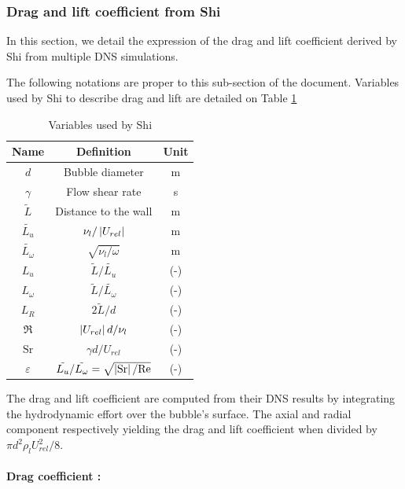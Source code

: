 \subsubsection{Drag and lift coefficient from Shi \etal}

In this section, we detail the expression of the drag and lift coefficient derived by Shi \etal from multiple DNS simulations.

\npar

The following notations are proper to this sub-section of the document. Variables used by Shi \etal to describe drag and lift are detailed on Table \ref{tab:var_shi}

\begin{table}[h!]
\centering
\begin{tabular}{|c|c|c|}
\hline
Name & Definition & Unit\\
\hline
\hline

$d$ & Bubble diameter & m\\
\hline
$\gamma$ & Flow shear rate & s\up{-1}\\
\hline
$\tilde{L}$& Distance to the wall & m\\
\hline
$\tilde{L_{u}}$ & $\nu_{l}/\left| U_{rel} \right|$ & m\\ 
\hline
$\tilde{L_{\omega}}$ & $\sqrt{\nu_{l}/\omega}$ & m\\
\hline
\hline
$L_{u}$ & $\tilde{L}/\tilde{L_{u}}$ & (-)\\
\hline
$L_{\omega}$ & $\tilde{L}/\tilde{L_{\omega}}$ & (-)\\
\hline
$L_{R}$ & $2\tilde{L}/d$ & (-)\\
\hline
$\Re$ & $\left| U_{rel} \right|d/\nu_{l}$ & (-)\\
\hline
$\mathrm{Sr}$ & $\gamma d / U_{rel}$ & (-)\\
\hline
$\varepsilon$ & $\tilde{L_{u}}/\tilde{L_{\omega}}=\sqrt{\left| \mathrm{Sr} \right|/\mathrm{Re}}$ & (-)\\
\hline
\end{tabular}
\caption{Variables used by Shi \etal}
\label{tab:var_shi}
\end{table}


The drag and lift coefficient are computed from their DNS results by integrating the hydrodynamic effort over the bubble's surface. The axial and radial component respectively yielding the drag and lift coefficient when divided by $\pi d^{2}\rho_{l}U_{rel}^{2}/8$.

\npar

\paragraph{Drag coefficient :}

